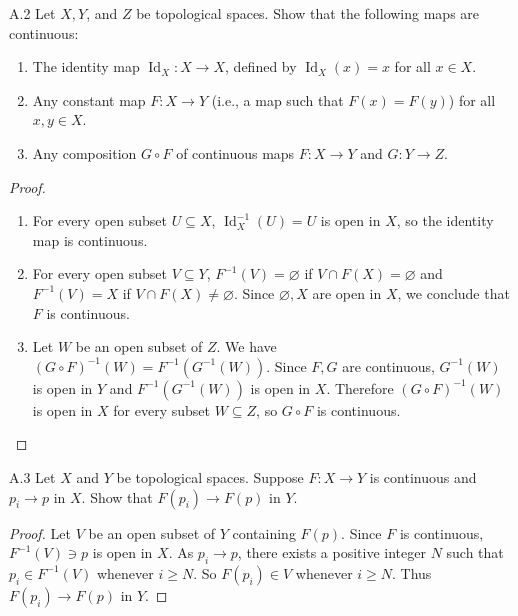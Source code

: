 \begin{exercise}{A.2}
    Let \( X, Y \), and \( Z \) be topological spaces. Show that the following maps are continuous:
    \begin{enumerate}[itemsep=0pt,label={(\alph*)}]
        \item The identity map \( \operatorname{Id}_{X}: X \to X \), defined by \( \operatorname{Id}_{X}(x) = x \) for all \( x \in X \).
        \item Any constant map \( F: X \to Y \) (i.e., a map such that \( F(x) = F(y) \)) for all \( x, y \in X \).
        \item Any composition \( G \circ F \) of continuous maps \( F: X \to Y \) and \( G: Y \to Z \).
    \end{enumerate}
\end{exercise}

\begin{proof}
    \begin{enumerate}[itemsep=0pt,label={(\alph*)}]
        \item For every open subset \( U \subseteq X \), \( \operatorname{Id}_{X}^{-1}(U) = U \) is open in \( X \), so the identity map is continuous.
        \item For every open subset \( V \subseteq Y \), \( F^{-1}(V) = \varnothing \) if \( V \cap F(X) = \varnothing \) and \( F^{-1}(V) = X \) if \( V \cap F(X) \ne \varnothing \). Since \( \varnothing, X \) are open in \( X \), we conclude that \( F \) is continuous.
        \item Let \( W \) be an open subset of \( Z \). We have \( {(G \circ F)}^{-1}(W) = F^{-1}(G^{-1}(W)) \). Since \( F, G \) are continuous, \( G^{-1}(W) \) is open in \( Y \) and \( F^{-1}(G^{-1}(W)) \) is open in \( X \). Therefore \( {(G \circ F)}^{-1}(W) \) is open in \( X \) for every subset \( W \subseteq Z \), so \( G \circ F \) is continuous.
    \end{enumerate}
\end{proof}

\begin{exercise}{A.3}
    Let \( X \) and \( Y \) be topological spaces. Suppose \( F: X \to Y \) is continuous and \( p_{i} \to p \) in \( X \). Show that \( F(p_{i}) \to F(p) \) in \( Y \).
\end{exercise}

\begin{proof}
    Let \( V \) be an open subset of \( Y \) containing \( F(p) \). Since \( F \) is continuous, \( F^{-1}(V) \ni p \) is open in \( X \). As \( p_{i} \to p \), there exists a positive integer \( N \) such that \( p_{i} \in F^{-1}(V) \) whenever \( i \ge N \). So \( F(p_{i}) \in V \) whenever \( i \ge N \). Thus \( F(p_{i}) \to F(p) \) in \( Y \).
\end{proof}


